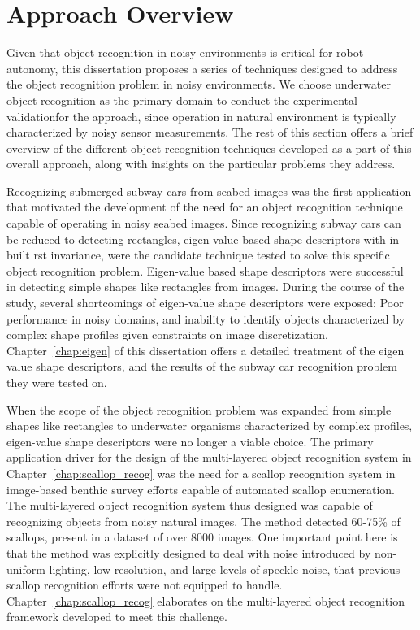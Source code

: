 \documentclass {udthesis}
\begin{document}
\section{Approach Overview}

Given that object recognition in noisy environments is critical for robot autonomy, this dissertation proposes a series of techniques designed to address the object recognition problem in noisy environments.
We choose
underwater object recognition as the primary domain to conduct the experimental validationfor the approach, since operation in natural environment is typically characterized by noisy sensor measurements.
The rest of this section offers a brief overview of the different object recognition techniques developed as a part of this overall approach, along with insights on the particular problems they address.

Recognizing submerged subway cars from seabed images was the first application that motivated the development of the need for 
an object recognition technique capable of operating in noisy seabed images. Since recognizing subway cars can be reduced 
to detecting rectangles, eigen-value based shape descriptors with in-built \gls{rst} invariance, were the candidate technique tested
to solve this specific object recognition problem. Eigen-value based shape descriptors were successful in detecting 
simple shapes like rectangles from images.
During the course of the study, several shortcomings of eigen-value shape descriptors were exposed: Poor performance in noisy domains, and inability to identify objects characterized by complex shape profiles given constraints on image discretization. Chapter~\ref{chap:eigen} of this dissertation offers a detailed treatment of the eigen value shape descriptors, and the results of the subway car recognition problem they were tested on.

When the scope of the object recognition problem was expanded from simple shapes like rectangles to underwater organisms characterized by complex profiles,
eigen-value shape descriptors were no longer a viable choice. The primary application driver for the design of the multi-layered object recognition system in Chapter~\ref{chap:scallop_recog} was the need for a 
scallop recognition system in image-based benthic survey efforts capable of automated scallop enumeration. 
The multi-layered object recognition system thus designed was capable of recognizing objects from noisy natural images. The method detected 60-75\% of scallops, present in a dataset of over 8000 images. One important point here is that the method was explicitly designed to deal with noise introduced by non-uniform lighting, low resolution, and large levels of speckle noise, that previous scallop recognition efforts were not equipped to handle. Chapter~\ref{chap:scallop_recog} elaborates on the multi-layered object recognition framework developed to meet this challenge.
\end{document}
